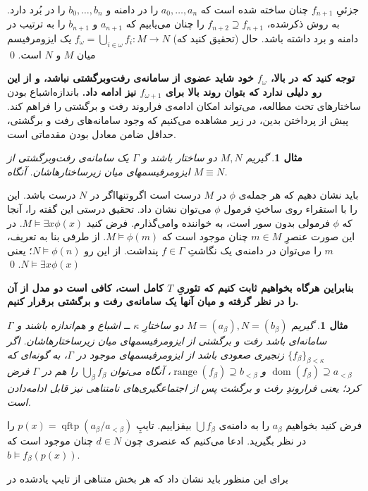 \documentclass[12pt,a4paper]{report}
\theoremstyle{colorhead}
\newtheorem{mesal}[thm]{مثال}
\DeclareMathOperator{\qftp}{qftp}
\DeclareMathOperator{\dom}{dom}
\DeclareMathOperator{\range}{range}
\begin{document}
 جزئیِ
 $f_{n+1}$
 چنان ساخته شده است که
 $a_0,\ldots,a_n$
 را در دامنه و 
 $b_0,\ldots,b_n$
 را در بُرد دارد. به روش ذکرشده،
 $f_{n+2}\supseteq f_{n+1}$
 را چنان می‌یابیم که 
 $a_{n+1}$
 و
 $b_{n+1}$
 را به ترتیب در دامنه و برد داشته باشد. حال (تحقیق کنید که)
 $f_\omega=\bigcup_{i\in \omega}{f_i}:M\to N$
 یک ایزومرفیسم میان
 $M$
 و
 $N$
 است. 
 \qed 
 \par 
\textbf{ توجه کنید که در بالا،
 $f_\omega$
 خود شاید عضوی از سامانه‌ی رفت‌وبرگشتی نباشد، و از این رو دلیلی ندارد که بتوان روند بالا برای
 $f_{\omega+1}$
 نیز ادامه داد. }
 باندازه‌اشباع بودن ساختارهای تحت مطالعه، می‌تواند امکان ادامه‌ی فراروند رفت و برگشتی را فراهم کند. پیش از پرداختن بدین، در زیر مشاهده می‌کنیم که وجود سامانه‌های رفت و برگشتی، حداقل ضامن معادل بودن مقدماتی است.
 \begin{mesal}
 گیریم
 $M,N$
 دو ساختار باشند و 
 $\Gamma$
 یک سامانه‌ی رفت‌وبرگشتی از ایزومرفیسمهای میان زیرساختارهاشان. آنگاه 
 $M\equiv N$.
 \end{mesal}
باید نشان دهیم که هر جمله‌ی
$\phi$
در
$M$
درست است اگروتنهااگر در
$N$
درست باشد. این را با استقراء روی ساختِ فرمول
$\phi$
می‌توان نشان داد. تحقیق درستی این گفته را، آنجا که
$\phi$
فرمولی بدون سور است، به خواننده وامی‌گذارم. فرض کنید
$M\models \exists x\phi(x)$.
در این صورت عنصرِ
$m\in M$
چنان موجود است که
$M\models \phi(m)$.
از طرفی بنا به تعریف، 
$m$
را می‌توان در دامنه‌ی یک نگاشتِ
$f\in \Gamma$
پنداشت. از این رو
$N\models \phi(n)$؛  
یعنی
$N\models \exists x\phi(x)$.
\qed
\par 
\textbf{بنابراین هرگاه بخواهیم ثابت کنیم که تئوریِ
$T$
کامل است، کافی است دو مدل از آن را در نظر گرفته و میان آنها یک سامانه‌ی رفت و برگشتی برقرار کنیم.}
\begin{mesal}
\label{53}
گیریم
$M=(a_\beta),N=(b_\beta)$
دو ساختارِ
$\kappa$ ــ
اشباع و هم‌اندازه باشند و 
$\Gamma$
سامانه‌ای باشد رفت و برگشتی از ایزومرفیسمهای میان زیرساختارهاشان.  اگر
$\{f_\beta\}_{\beta<\kappa}$
زنجیری صعودی باشد از ایزومرفیسمهای موجود در
$\Gamma$،
به گونه‌ای که
$\dom(f_\beta)\supseteq a_{<\beta}$
و
$\range (f_\beta)\supseteq b_{<\beta}$،
آنگاه می‌توان 
$\bigcup_\beta f_\beta$
را هم در 
$\Gamma$
فرض کرد؛ یعنی فراروندِ
رفت و برگشت پس از اجتماعگیری‌های نامتناهی نیز قابل ادامه‌دادن است. 
\end{mesal}
فرض کنید بخواهیم
$a_\beta$
را به دامنه‌ی
$\bigcup f_\beta$
بیفزاییم. تایپِ
$p(x)=\qftp(a_\beta/a_{<\beta})$
را در نظر بگیرید. ادعا می‌کنیم که عنصری چون
$d\in N$
چنان موجود است که 
$b\models f_\beta (p(x))$.
\par 
برای این منظور باید نشان داد که هر بخش متناهی از تایپ یادشده در 
\end{document}
